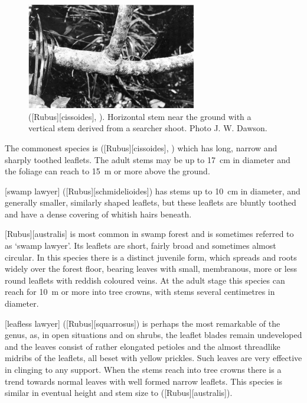 \begin{figure}
	\includegraphics[width=0.66\textwidth]{graphics/figure36bushlawyer.jpg}
	\centering
	\caption[Tataramoa, (bush lawyer)]{ ([Rubus][cissoides], ).
	Horizontal stem near the ground with a vertical stem derived from a searcher shoot.
	Photo  J. W. Dawson.}%
	\label{fig:36bushlawyer}
\end{figure}


The commonest species is  ([Rubus][cissoides], ) which has long, narrow and sharply toothed leaflets.
The adult stems may be up to \SI{17}{\centi\metre} in diameter and the foliage can reach to \SI{15}{\metre} or more above the ground.

[swamp lawyer] ([Rubus][schmidelioides]) has stems up to \SI{10}{\centi\metre} in diameter, and generally smaller, similarly shaped leaflets, but these leaflets are bluntly toothed and have a dense covering of whitish hairs beneath.

[Rubus][australis] is most common in swamp forest and is sometimes referred to as `swamp lawyer'.
Its leaflets are short, fairly broad and sometimes almost circular.
In this species there is a distinct juvenile form, which spreads and roots widely over the forest floor, bearing leaves with small, membranous, more or less round leaflets with reddish coloured veins.
At the adult stage this species can reach for \SI{10}{\metre} or more into tree crowns, with stems several centimetres in diameter.

[leafless lawyer] ([Rubus][squarrosus]) is perhaps the most remarkable of the genus, as, in open situations and on shrubs, the leaflet blades remain undeveloped and the leaves consist of rather elongated petioles and the almost threadlike midribs of the leaflets, all beset with yellow prickles.
Such leaves are very effective in clinging to any support.
When the stems reach into tree crowns there is a trend towards normal leaves with well formed narrow leaflets.
This species is similar in eventual height and stem size to  ([Rubus][australis]).

